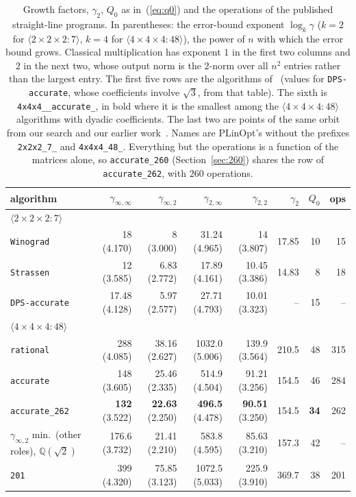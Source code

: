 \documentclass[11pt]{article}
\theoremstyle{remark}
\newcommand{\Q}{\mathbb{Q}}
\newcommand{\ginf}{\gamma_{\infty,2}}
\newcommand{\giinf}{\gamma_{\infty,\infty}}
\newcommand{\mm}[1]{\langle #1\rangle}
\newcommand{\acct}{\texttt{4x4x4\_\allowbreak 48\_\allowbreak accurate\_\allowbreak 262}\xspace}
\begin{document}
\begin{table}[t]
\centering
\caption{Growth factors, $\gamma_2$, $Q_0$ as in~(\ref{eq:q0}) and the operations of the
published straight-line programs.  In parentheses: the error-bound
exponent $\log_k\gamma$ ($k=2$ for $\mm{2\times2\times2:7}$, $k=4$ for
$\mm{4\times4\times4:48}$), the power of $n$ with which the error bound
grows.  Classical multiplication has exponent $1$ in the first two
columns and $2$ in the next two, whose output norm is the $2$-norm
over all $n^2$ entries rather than the largest entry.  The first five rows are the algorithms
of~\cite[Table~2]{DPS26a} (values for \texttt{DPS-accurate}, whose
coefficients involve $\sqrt3$, from that table).  The sixth is \acct, in bold where it is
the smallest among the $\mm{4\times4\times4:48}$ algorithms with dyadic
coefficients.  The last two are points of the same orbit from our
search and our earlier work~\cite{S26}.  Names
are PLinOpt's without the prefixes \texttt{2x2x2\_7\_} and
\texttt{4x4x4\_48\_}.  Everything but the operations is a function of the
matrices alone, so \texttt{accurate\_260} (Section~\ref{sec:260}) shares the
row of \texttt{accurate\_262}, with $260$ operations.}
\label{tab:gamma}
\footnotesize
\setlength{\tabcolsep}{4pt}
\begin{tabular}{lrrrrrrr}
\toprule
algorithm & $\giinf$ & $\ginf$ & $\gamma_{2,\infty}$ & $\gamma_{2,2}$ & $\gamma_2$ & $Q_0$ & ops\\
\midrule
\multicolumn{8}{l}{$\mm{2\times2\times2:7}$}\\
\quad \texttt{Winograd} & 18 (4.170) & 8 (3.000) & 31.24 (4.965) & 14 (3.807) & 17.85 & 10 & 15\\
\quad \texttt{Strassen} & 12 (3.585) & 6.83 (2.772) & 17.89 (4.161) & 10.45 (3.386) & 14.83 & 8 & 18\\
\quad \texttt{DPS-accurate}~\cite{DPS24} & 17.48 (4.128) & 5.97 (2.577) & 27.71 (4.793) & 10.01 (3.323) & -- & 15 & --\\
\multicolumn{8}{l}{$\mm{4\times4\times4:48}$}\\
\quad \texttt{rational}~\cite{DPS25} & 288 (4.085) & 38.16 (2.627) & 1032.0 (5.006) & 139.9 (3.564) & 210.5 & 48 & 315\\
\quad \texttt{accurate}~\cite{DPS26a} & 148 (3.605) & 25.46 (2.335) & 514.9 (4.504) & 91.21 (3.256) & 154.5 & 46 & 284\\
\quad \texttt{accurate\_262} & \textbf{132} (3.522) & \textbf{22.63} (2.250) & \textbf{496.5} (4.478) & \textbf{90.51} (3.250) & 154.5 & \textbf{34} & 262\\
\quad $\ginf$ min.\ (other roles), $\Q(\sqrt2)$ & 176.6 (3.732) & 21.41 (2.210) & 583.8 (4.595) & 85.63 (3.210) & 157.3 & 42 & --\\
\quad \texttt{201}~\cite{S26} & 399 (4.320) & 75.85 (3.123) & 1072.5 (5.033) & 225.9 (3.910) & 369.7 & 38 & 201\\
\bottomrule
\end{tabular}
\end{table}
\end{document}
